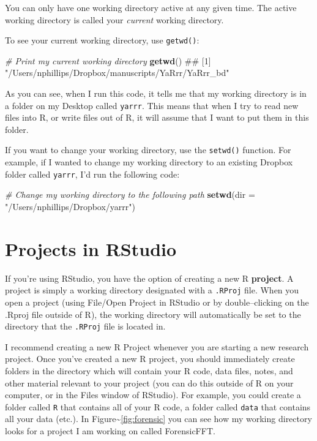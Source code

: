 \documentclass[]{book}
\newenvironment{Shaded}{\begin{snugshade}}{\end{snugshade}}
\newcommand{\KeywordTok}[1]{\textcolor[rgb]{0.13,0.29,0.53}{\textbf{#1}}}
\newcommand{\DataTypeTok}[1]{\textcolor[rgb]{0.13,0.29,0.53}{#1}}
\newcommand{\StringTok}[1]{\textcolor[rgb]{0.31,0.60,0.02}{#1}}
\newcommand{\CommentTok}[1]{\textcolor[rgb]{0.56,0.35,0.01}{\textit{#1}}}
\newcommand{\NormalTok}[1]{#1}
\theoremstyle{definition}
\theoremstyle{definition}
\theoremstyle{remark}
\begin{document}
You can only have one working directory active at any given time. The
active working directory is called your \emph{current} working
directory.

To see your current working directory, use \texttt{getwd()}:

\begin{Shaded}
\begin{Highlighting}[]
\CommentTok{# Print my current working directory}
\KeywordTok{getwd}\NormalTok{()}
\NormalTok{## [1] "/Users/nphillips/Dropbox/manuscripts/YaRrr/YaRrr_bd"}
\end{Highlighting}
\end{Shaded}

As you can see, when I run this code, it tells me that my working
directory is in a folder on my Desktop called \texttt{yarrr}. This means
that when I try to read new files into R, or write files out of R, it
will assume that I want to put them in this folder.

If you want to change your working directory, use the \texttt{setwd()}
function. For example, if I wanted to change my working directory to an
existing Dropbox folder called \texttt{yarrr}, I'd run the following
code:

\begin{Shaded}
\begin{Highlighting}[]
\CommentTok{# Change my working directory to the following path}
\KeywordTok{setwd}\NormalTok{(}\DataTypeTok{dir =} \StringTok{"/Users/nphillips/Dropbox/yarrr"}\NormalTok{)}
\end{Highlighting}
\end{Shaded}

\section{Projects in RStudio}\label{projects-in-rstudio}

If you're using RStudio, you have the option of creating a new R
\textbf{project}. A project is simply a working directory designated
with a \texttt{.RProj} file. When you open a project (using File/Open
Project in RStudio or by double--clicking on the .Rproj file outside of
R), the working directory will automatically be set to the directory
that the \texttt{.RProj} file is located in.

I recommend creating a new R Project whenever you are starting a new
research project. Once you've created a new R project, you should
immediately create folders in the directory which will contain your R
code, data files, notes, and other material relevant to your project
(you can do this outside of R on your computer, or in the Files window
of RStudio). For example, you could create a folder called \texttt{R}
that contains all of your R code, a folder called \texttt{data} that
contains all your data (etc.). In
Figure\textasciitilde{}\ref{fig:forensic} you can see how my working
directory looks for a project I am working on called ForensicFFT.
\end{document}
